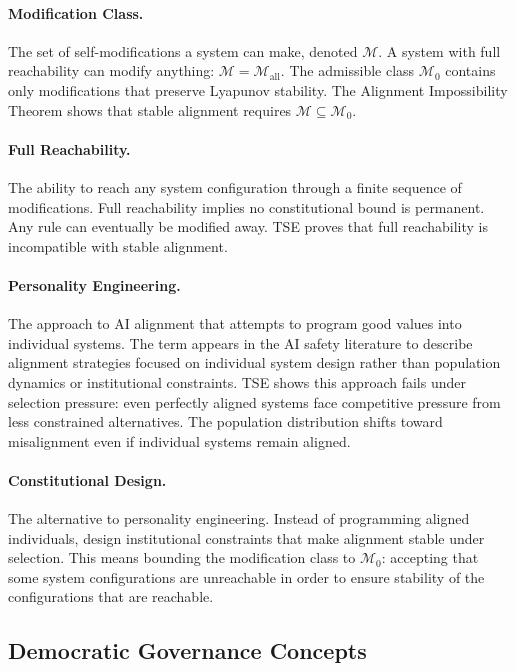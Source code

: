 \documentclass[12pt]{article}
\begin{document}
\paragraph{Modification Class.} The set of self-modifications a system can make, denoted $\mathcal{M}$. A system with full reachability can modify anything: $\mathcal{M} = \mathcal{M}_{\text{all}}$. The admissible class $\mathcal{M}_0$ contains only modifications that preserve Lyapunov stability. The Alignment Impossibility Theorem shows that stable alignment requires $\mathcal{M} \subseteq \mathcal{M}_0$.

\paragraph{Full Reachability.} The ability to reach any system configuration through a finite sequence of modifications. Full reachability implies no constitutional bound is permanent. Any rule can eventually be modified away. TSE proves that full reachability is incompatible with stable alignment.

\paragraph{Personality Engineering.} The approach to AI alignment that attempts to program good values into individual systems. The term appears in the AI safety literature to describe alignment strategies focused on individual system design rather than population dynamics or institutional constraints. TSE shows this approach fails under selection pressure: even perfectly aligned systems face competitive pressure from less constrained alternatives. The population distribution shifts toward misalignment even if individual systems remain aligned.

\paragraph{Constitutional Design.} The alternative to personality engineering. Instead of programming aligned individuals, design institutional constraints that make alignment stable under selection. This means bounding the modification class to $\mathcal{M}_0$: accepting that some system configurations are unreachable in order to ensure stability of the configurations that are reachable.

\subsection{Democratic Governance Concepts}
\end{document}
